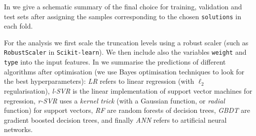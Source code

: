 In  we give a schematic summary of the final choice for training, validation and test sets after assigning the samples corresponding to the chosen \texttt{solutions} in each fold. 

For the \ml analysis we first scale the truncation levels using a robust scaler (such as \texttt{RobustScaler} in \texttt{Scikit-learn}).
We then include also the variables \texttt{weight} and \texttt{type} into the input features.
In  we summarise the predictions of different algorithms after optimisation (we use Bayes optimisation techniques to look for the best hyperparameters): \emph{LR} refers to linear regression (with $\ell_2$ regularisation), \emph{l-SVR} is the linear implementation of support vector machines for regression, \emph{r-SVR} uses a \emph{kernel trick} (with a Gaussian function, or \emph{radial} function) for support vectors, \emph{RF} are random forests of decision trees, \emph{GBDT} are gradient boosted decision trees, and finally \emph{ANN} refers to artificial neural networks.\footnotemark{}

